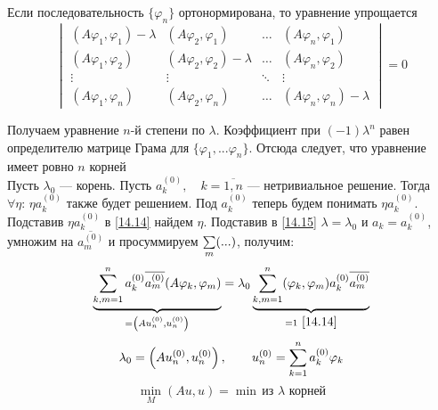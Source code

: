 Если последовательность $\{ \varphi_n \}$ ортонормирована, то уравнение упрощается
\[ \begin{vmatrix}
	(A\varphi_1, \varphi_1) - \lambda & (A\varphi_2, \varphi_1) & \dots & (A\varphi_n, \varphi_1) \\
	(A\varphi_1, \varphi_2) & (A\varphi_2, \varphi_2) - \lambda  & \dots & (A\varphi_n, \varphi_2)  \\ 
	\vdots & \vdots & \ddots & \vdots \\
	(A\varphi_1, \varphi_n)  & (A\varphi_2, \varphi_n) & \dots & (A\varphi_n, \varphi_n) - \lambda
\end{vmatrix}
= 0 \label{14.17} \tag{14.17} \]

Получаем уравнение $n$-й степени по $\lambda$. Коэффициент при  $ (-1) \lambda^n $ равен определителю матрице Грама для $ \{ \varphi_1, ... \varphi_n \}.$ Отсюда следует, что уравнение имеет ровно $n$ корней \\

Пусть $ \lambda_0 $ --- корень. Пусть $a_k^{(0)}, \quad k=\overline{1,n}$ --- нетривиальное решение. Тогда $ \forall \eta: \, \eta a_k^{(0)}$ также будет решением. Под $a_k^{(0)}$ теперь будем понимать $\eta a_k^{(0)}$. Подставив $\eta a_k^{(0)}$ в \eqref{14.14} найдем $\eta$. Подставив в \eqref{14.15} $\lambda = \lambda_0$ и $a_k = a_k^{(0)}$, умножим на $\overline{a_m^{(0)}}$ и просуммируем $\sum\limits_m (...)$, получим:
\[ \underbrace{\sum\limits_{k,m=1}^{n} a_k^{(0)} \overline{a_m^{(0)}} (A \varphi_k, \varphi_m)}_{= \left(Au_n^{(0)}, u_n^{(0)}\right)} = \lambda_0 \underbrace{\sum\limits_{k,m=1}^{n} (\varphi_k, \varphi_m) a_k^{(0)} \overline{a_m^{(0)}}}_{=1 \ \eqref{14.14}} \]
\[ \lambda_0 = \left(Au_n^{(0)}, u_n^{(0)}\right), \qquad u_n^{(0)} = \sum\limits_{k=1}^n a_k^{(0)} \varphi_k \]
\[ \underset{M}{\min} (Au, u) = \min \, \text{из $\lambda$ корней} \]
